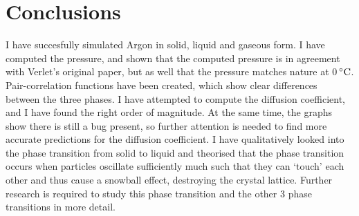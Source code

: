 \section{Conclusions}
I have succesfully simulated Argon in solid, liquid and gaseous form. I have
computed the pressure, and shown that the computed pressure is in agreement with
Verlet's original paper, but as well that the pressure matches nature at
0$\,^{\circ}{\rm C}$.
Pair-correlation functions have been created, which show clear differences
between the three phases.
I have attempted to compute the diffusion coefficient, and I have found the
right order of magnitude. At the same time, the graphs show there is still a bug
present, so further attention is needed to find more accurate predictions for
the diffusion coefficient.
I have qualitatively looked into the phase transition from solid to liquid and
theorised that the phase transition occurs when particles oscillate
sufficiently much such that they can `touch' each other and thus cause a
snowball effect, destroying the crystal lattice.
Further research is required to study this phase transition and the other 3
phase transitions in more detail.
